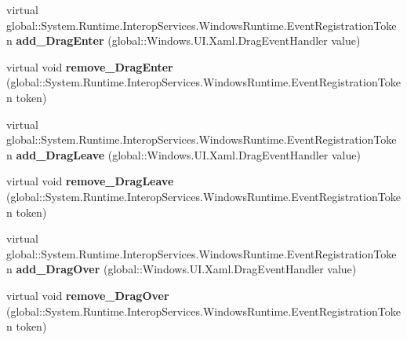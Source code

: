 \begin{DoxyCompactItemize}
\item 
\mbox{\label{class_windows_1_1_u_i_1_1_xaml_1_1_u_i_element_a84e265c30f9ba7acab529bdfc0475eb7}} 
virtual global\+::\+System.\+Runtime.\+Interop\+Services.\+Windows\+Runtime.\+Event\+Registration\+Token {\bfseries add\+\_\+\+Drag\+Enter} (global\+::\+Windows.\+U\+I.\+Xaml.\+Drag\+Event\+Handler value)
\item 
\mbox{\label{class_windows_1_1_u_i_1_1_xaml_1_1_u_i_element_ab1b0c333cb61061297f04ff3341ed26d}} 
virtual void {\bfseries remove\+\_\+\+Drag\+Enter} (global\+::\+System.\+Runtime.\+Interop\+Services.\+Windows\+Runtime.\+Event\+Registration\+Token token)
\item 
\mbox{\label{class_windows_1_1_u_i_1_1_xaml_1_1_u_i_element_a09d1a9af723d25f04884ff5c295f0e44}} 
virtual global\+::\+System.\+Runtime.\+Interop\+Services.\+Windows\+Runtime.\+Event\+Registration\+Token {\bfseries add\+\_\+\+Drag\+Leave} (global\+::\+Windows.\+U\+I.\+Xaml.\+Drag\+Event\+Handler value)
\item 
\mbox{\label{class_windows_1_1_u_i_1_1_xaml_1_1_u_i_element_ad92e1bfdb1f8c87efd732bbc3fb71ab9}} 
virtual void {\bfseries remove\+\_\+\+Drag\+Leave} (global\+::\+System.\+Runtime.\+Interop\+Services.\+Windows\+Runtime.\+Event\+Registration\+Token token)
\item 
\mbox{\label{class_windows_1_1_u_i_1_1_xaml_1_1_u_i_element_ab912e89cec08f1d3a71ac840cb1a7964}} 
virtual global\+::\+System.\+Runtime.\+Interop\+Services.\+Windows\+Runtime.\+Event\+Registration\+Token {\bfseries add\+\_\+\+Drag\+Over} (global\+::\+Windows.\+U\+I.\+Xaml.\+Drag\+Event\+Handler value)
\item 
\mbox{\label{class_windows_1_1_u_i_1_1_xaml_1_1_u_i_element_a42cb32bddd90c0040c369b5317c8c3c4}} 
virtual void {\bfseries remove\+\_\+\+Drag\+Over} (global\+::\+System.\+Runtime.\+Interop\+Services.\+Windows\+Runtime.\+Event\+Registration\+Token token)
\item 
\mbox{\label{class_windows_1_1_u_i_1_1_xaml_1_1_u_i_element_aaa06508f3ebb80d04bb09db0a46cd1bf}} 

\end{DoxyCompactItemize}
